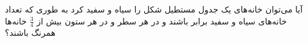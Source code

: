 \EXERCISE
آیا می‌توان خانه‌های یک جدول مستطیل شکل را سیاه و سفید کرد به طوری که تعداد خانه‌های سیاه و سفید برابر باشند و در هر سطر و در هر ستون بیش از
$\frac{3}{4}$
خانه‌ها همرنگ باشند؟
